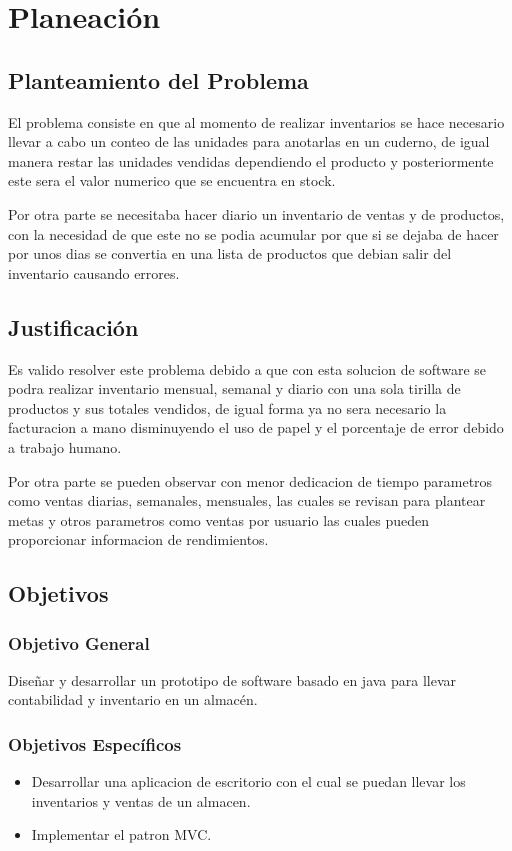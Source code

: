 \chapter{Planeación}
\section{Planteamiento del Problema}

El problema consiste en que al momento de realizar inventarios se hace necesario llevar a cabo un conteo de las unidades para anotarlas en un cuderno, de igual manera restar las unidades vendidas dependiendo el producto y posteriormente este sera el valor numerico que se encuentra en stock.

Por otra parte se necesitaba hacer diario un inventario de ventas y de productos, con la necesidad de que este no se podia acumular por que si se dejaba de hacer por unos dias se convertia en una lista de productos que debian salir del inventario causando errores.


\section{Justificación}

Es valido resolver este problema debido a que con esta solucion de software se podra realizar inventario mensual, semanal y diario con una sola tirilla de productos y sus totales vendidos, de igual forma ya no sera necesario la facturacion a mano disminuyendo el uso de papel y el porcentaje de error debido a trabajo humano.

Por otra parte se pueden observar con menor dedicacion de tiempo parametros como ventas diarias, semanales, mensuales, las cuales se revisan para plantear metas y otros parametros como ventas por usuario las cuales pueden proporcionar informacion de rendimientos.


\section{Objetivos}
\subsection{Objetivo General}

Diseñar y desarrollar un prototipo de software basado en java para llevar contabilidad y inventario en un almacén.

\subsection{Objetivos Específicos}
\begin{itemize}
    \item Desarrollar una aplicacion de escritorio con el cual se puedan llevar los inventarios y ventas de un almacen.
    \item Implementar el patron MVC.

\end{itemize}

